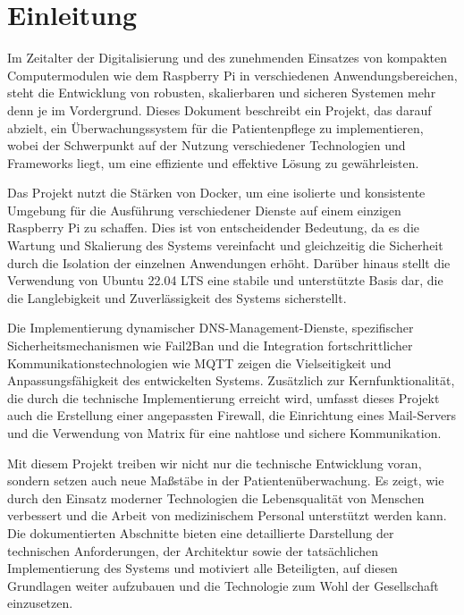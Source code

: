 \section{Einleitung}

Im Zeitalter der Digitalisierung und des zunehmenden Einsatzes von kompakten Computermodulen wie dem Raspberry Pi in verschiedenen Anwendungsbereichen, steht die Entwicklung von robusten, skalierbaren und sicheren Systemen mehr denn je im Vordergrund. Dieses Dokument beschreibt ein Projekt, das darauf abzielt, ein Überwachungssystem für die Patientenpflege zu implementieren, wobei der Schwerpunkt auf der Nutzung verschiedener Technologien und Frameworks liegt, um eine effiziente und effektive Lösung zu gewährleisten.

Das Projekt nutzt die Stärken von Docker, um eine isolierte und konsistente Umgebung für die Ausführung verschiedener Dienste auf einem einzigen Raspberry Pi zu schaffen. Dies ist von entscheidender Bedeutung, da es die Wartung und Skalierung des Systems vereinfacht und gleichzeitig die Sicherheit durch die Isolation der einzelnen Anwendungen erhöht. Darüber hinaus stellt die Verwendung von Ubuntu 22.04 LTS eine stabile und unterstützte Basis dar, die die Langlebigkeit und Zuverlässigkeit des Systems sicherstellt.

Die Implementierung dynamischer DNS-Management-Dienste, spezifischer Sicherheitsmechanismen wie Fail2Ban und die Integration fortschrittlicher Kommunikationstechnologien wie MQTT zeigen die Vielseitigkeit und Anpassungsfähigkeit des entwickelten Systems. Zusätzlich zur Kernfunktionalität, die durch die technische Implementierung erreicht wird, umfasst dieses Projekt auch die Erstellung einer angepassten Firewall, die Einrichtung eines Mail-Servers und die Verwendung von Matrix für eine nahtlose und sichere Kommunikation.

Mit diesem Projekt treiben wir nicht nur die technische Entwicklung voran, sondern setzen auch neue Maßstäbe in der Patientenüberwachung. Es zeigt, wie durch den Einsatz moderner Technologien die Lebensqualität von Menschen verbessert und die Arbeit von medizinischem Personal unterstützt werden kann. Die dokumentierten Abschnitte bieten eine detaillierte Darstellung der technischen Anforderungen, der Architektur sowie der tatsächlichen Implementierung des Systems und motiviert alle Beteiligten, auf diesen Grundlagen weiter aufzubauen und die Technologie zum Wohl der Gesellschaft einzusetzen.